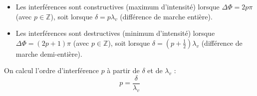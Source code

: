\documentclass[a4paper,12pt]{article}
\begin{document}
        \begin{itemize}
            \item Les interférences sont constructives (maximum d'intensité) lorsque $\Delta \Phi = 2 p \pi$ (avec $p \in \mathbb{Z}$), soit lorsque $\delta = p\lambda_v$ (différence de marche entière).
            \item Les interférences sont destructives (minimum d'intensité) lorsque $\Delta \Phi = (2 p + 1) \pi$ (avec $p \in \mathbb{Z}$), soit lorsque $\delta = (p + \frac{1}{2})\lambda_v$ (différence de marche demi-entière).
        \end{itemize}

        On calcul l'ordre d'interférence $p$ à partir de $\delta$ et de $\lambda_v$ :
        $$ p = \frac{\delta}{\lambda_v} $$        
\end{document}
